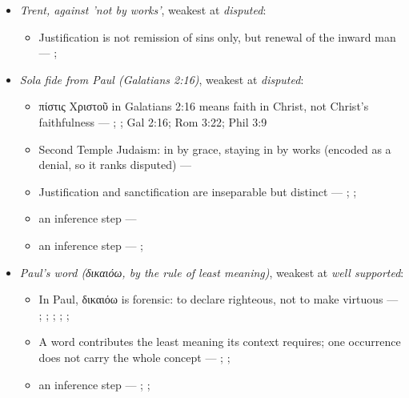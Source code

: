 \documentclass[11pt]{article}
\begin{document}
\begin{itemize}
\item \emph{Trent, against 'not by works'}, weakest at \emph{disputed}:
\begin{itemize}
\item Justification is not remission of sins only, but renewal of the inward man --- \cite[Trent, Session VI (1547), Decree on Justification, ch. 7]{tanner-decrees-1990}; \cite[Trent, Session VI (1547), canon 11]{tanner-decrees-1990}
\end{itemize}
\item \emph{Sola fide from Paul (Galatians 2:16)}, weakest at \emph{disputed}:
\begin{itemize}
\item πίστις Χριστοῦ in Galatians 2:16 means faith in Christ, not Christ's faithfulness --- \cite{dunn-once-more-pistis-christou-1991}; \cite{matlock-detheologizing-2000}; Gal 2:16; Rom 3:22; Phil 3:9
\item Second Temple Judaism: in by grace, staying in by works (encoded as a denial, so it ranks disputed) --- \cite{sanders-paul-palestinian-judaism-1977}
\item Justification and sanctification are inseparable but distinct --- \cite[XIII.1]{westminster-confession-1647}; \cite[XI.1]{westminster-confession-1647}; \cite[III.xi.6]{calvin-institutes-1960}
\item an inference step --- \cite[Trent, Session VI (1547), canon 9]{tanner-decrees-1990}
\item an inference step --- \cite{gathercole-where-boasting-2002}; \cite{carson-variegated-nomism-1-2001}
\end{itemize}
\item \emph{Paul's word (δικαιόω, by the rule of least meaning)}, weakest at \emph{well supported}:
\begin{itemize}
\item In Paul, δικαιόω is forensic: to declare righteous, not to make virtuous --- \cite[s.v. δικαιόω]{bauer-danker-lexicon-2000}; \cite{morris-apostolic-preaching-1965}; \cite[p. 80]{moo-romans-1996}; \cite{irons-righteousness-of-god-2015}; \cite{wright-justification-2009}; \cite[ad loc. Rom 3:24]{fitzmyer-romans-1993}
\item A word contributes the least meaning its context requires; one occurrence does not carry the whole concept --- \cite{silva-biblical-words-1994}; \cite{joos-semantic-axiom-1972}; \cite{barr-semantics-2004}
\item an inference step --- \cite{silva-biblical-words-1994}; \cite[p. 80]{moo-romans-1996}; \cite{barr-semantics-2004}

\end{itemize}
\end{itemize}
\end{document}
